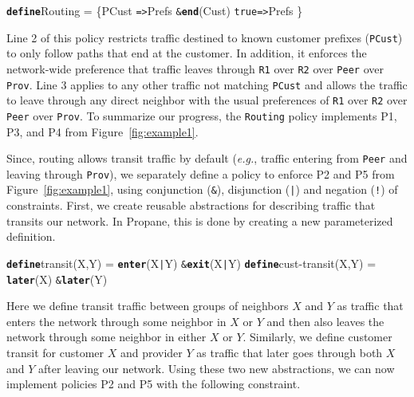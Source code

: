 \documentclass[10pt]{sigalternate052015}
\newcommand{\EG}{\emph{e.g.}}
\newcommand{\sysname}{{\small \sf Propane}\xspace}
\newcommand{\CD}[1]{\texttt{\small #1}}  %
\newcommand{\KW}[1]{\texttt{\small\bfseries{#1}}}
\newcommand{\True}{\CD{true}}
\newcommand{\Define}{\KW{define}}
\newcommand{\Path}{\texttt{=>}}
\newcommand{\AND}{\texttt{\&}}
\newcommand{\OR}{\texttt{|}}
\newcommand{\NOT}{\texttt{!}}
\newcommand{\Exit}{\KW{exit}}
\newcommand{\End}{\KW{end}}
\newcommand{\Enter}{\KW{enter}}
\newcommand{\Later}{\KW{later}}
\renewcommand{\path}[2]{ #1 \mapsto \ensuremath{#2} }
\begin{document}

\begin{code}
\Define Routing =
    \{PCust \Path Prefs \AND \End(Cust)
     \True  \Path Prefs \}
\end{code}
\noindent

Line 2 of this policy
restricts traffic destined to known customer prefixes (\CD{PCust}) to only follow paths that end at the customer. In addition, it enforces the network-wide preference that traffic leaves through \CD{R1} over \CD{R2} over \CD{Peer} over \CD{Prov}.
Line 3 applies to any other traffic not matching \CD{PCust} and allows the traffic to leave through any direct neighbor with the usual preferences of \CD{R1} over \CD{R2} over \CD{Peer} over \CD{Prov}. To summarize our progress, the \CD{Routing} policy
implements P1, P3, and P4 from Figure~\ref{fig:example1}.


Since, routing allows transit traffic by default (\EG, traffic entering from
\CD{Peer} and leaving through \CD{Prov}), we separately define a
policy to enforce P2 and P5 from Figure~\ref{fig:example1}, using conjunction (\AND),
disjunction (\OR) and negation (\NOT) of constraints.
First, we create reusable abstractions for describing traffic that transits our network. In \sysname, this is done by creating a new parameterized definition.
\begin{code}
\Define transit(X,Y) = \Enter(X{\OR}Y) \AND \Exit(X{\OR}Y)
\Define cust-transit(X,Y) = \Later(X) \AND \Later(Y)
\end{code}
\noindent
Here we define transit traffic between groups of neighbors $X$ and $Y$ as traffic that enters the network through some neighbor in $X$ or $Y$ and then also leaves the network through some neighbor in either $X$ or $Y$. Similarly, we define customer transit for customer $X$ and provider $Y$ as traffic that later goes through both $X$ and $Y$ after leaving our network. Using these two new abstractions, we can now implement policies P2 and P5 with the following constraint.
\end{document}
